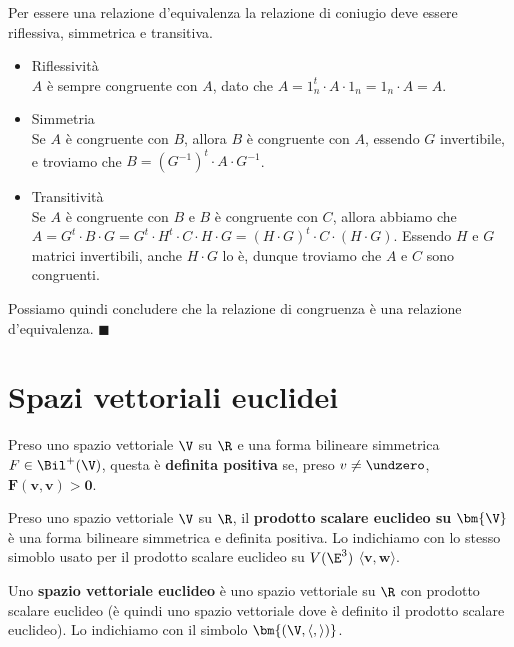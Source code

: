 \documentclass[11pt, a4paper, titlepage, oneside]{scrbook}
\begin{document}
Per essere una relazione d'equivalenza la relazione di coniugio deve essere riflessiva, simmetrica e transitiva.
\begin{itemize}
    \item Riflessività \\
    $A$ è sempre congruente con $A$, dato che $A = 1_n^t \cdot A \cdot 1_n = 1_n \cdot A = A$.
    \item Simmetria \\
    Se $A$ è congruente con $B$, allora $B$ è congruente con $A$, essendo $G$ invertibile, e troviamo che $B = (G^{-1})^t \cdot A \cdot G^{-1}$. \\
    \item Transitività \\
    Se $A$ è congruente con $B$ e $B$ è congruente con $C$, allora abbiamo che \mbox{$A = G^t \cdot B \cdot G = G^t \cdot H^t \cdot C \cdot H \cdot G = (H \cdot G)^t \cdot C \cdot (H \cdot G)$}. Essendo $H$ e $G$ matrici invertibili, anche $H \cdot G$ lo è, dunque troviamo che $A$ e $C$ sono congruenti. 
\end{itemize}

Possiamo quindi concludere che la relazione di congruenza è una relazione d'equivalenza. $\blacksquare$

\section{Spazi vettoriali euclidei}

\begin{Definizione}
\label{def-forma-bilineare-definita-positiva}
Preso uno spazio vettoriale $\V$ su $\R$ e una forma bilineare simmetrica $F \in \Bil^+(\V)$, questa è \textbf{definita positiva} se, preso $v \neq \undzero$, $\bm{F(v,v) > 0}$.
\end{Definizione}

\begin{Definizione}
\label{def-prodotto-scalare-euclideo}
Preso uno spazio vettoriale $\V$ su $\R$, il \textbf{prodotto scalare euclideo su} $\bm{\V}$ è una forma bilineare simmetrica e definita positiva. Lo indichiamo con lo stesso simoblo usato per il prodotto scalare euclideo su $V(\E^3)$ $\bm{\langle v,w \rangle}$.
\end{Definizione}

\begin{Definizione}
\label{def-spazio-vettoriale-euclideo}
Uno \textbf{spazio vettoriale euclideo} è uno spazio vettoriale su $\R$ con prodotto scalare euclideo (è quindi uno spazio vettoriale dove è definito il prodotto scalare euclideo). Lo indichiamo con il simbolo $\bm{(\V, \langle , \rangle)}$.
\end{Definizione}
\end{document}
